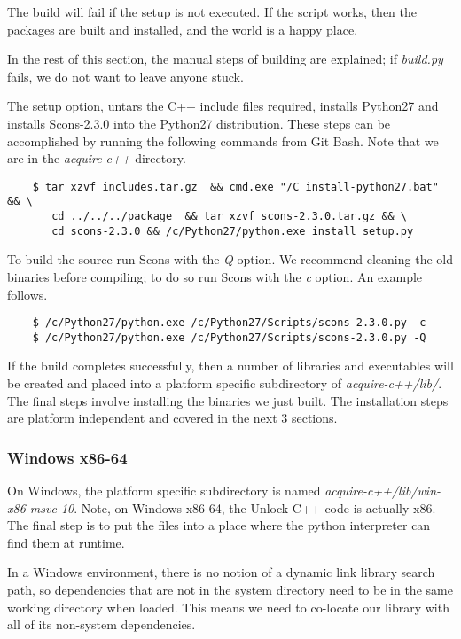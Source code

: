 \documentclass[11pt]{article}
\begin{document}
The build will fail if the setup is not executed.  If the script works, then the packages are built and installed, and the world is a happy place.  

In the rest of this section, the manual steps of building are explained; if \textit{build.py} fails, we do not want to leave anyone stuck.

The setup option, untars the C++ include files required, installs Python27 and installs Scons-2.3.0 into the Python27 distribution.  These steps can be accomplished by running the following commands from Git Bash.  Note that we are in the \textit{acquire-c++} directory.

\begin{verbatim}
    $ tar xzvf includes.tar.gz  && cmd.exe "/C install-python27.bat"  && \ 
       cd ../../../package  && tar xzvf scons-2.3.0.tar.gz && \
       cd scons-2.3.0 && /c/Python27/python.exe install setup.py  
\end{verbatim}

To build the source run Scons with the \textit{\-Q} option. We recommend cleaning the old binaries before compiling; to do so run Scons with the \textit{\-c} option.  An example follows.
\begin{verbatim}
    $ /c/Python27/python.exe /c/Python27/Scripts/scons-2.3.0.py -c 
    $ /c/Python27/python.exe /c/Python27/Scripts/scons-2.3.0.py -Q
\end{verbatim}

If the build completes successfully, then a number of libraries and executables will be created and placed into a platform specific subdirectory of \textit{acquire-c++/lib/}.  The final steps involve installing the binaries we just built.  The installation steps are platform independent and covered in the next 3 sections.

\subsubsection{Windows x86-64}

On Windows, the platform specific subdirectory is named \textit{acquire-c++/lib/win-x86-msvc-10}.  Note, on Windows x86-64, the Unlock C++ code is actually x86.  The final step is to put the files into a place where the python interpreter can find them at runtime.

In a Windows environment, there is no notion of a dynamic link library search path, so dependencies that are not in the system directory need to be in the same working directory when loaded.  This means we need to co-locate our library with all of its non-system dependencies.
\end{document}
